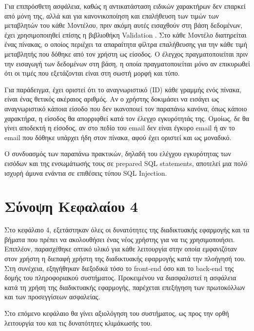 Για επιπρόσθετη ασφάλεια, καθώς η αντικατάσταση ειδικών χαρακτήρων δεν επαρκεί από μόνη της, αλλά και για κανονικοποίηση και επαλήθευση των τιμών των μεταβλητών του κάθε Μοντέλου, πριν ακόμη αυτές εισαχθούν στη βάση δεδομένων, έχει χρησιμοποιηθεί επίσης η βιβλιοθήκη Validation \cite{CodeIgniter_validation}. Στο κάθε Μοντέλο διατηρείται ένας πίνακας, ο οποίος περιέχει τα απαραίτητα φίλτρα επαλήθευσης για την κάθε τιμή μεταβλητής που δόθηκε από τον χρήστη ως είσοδος. Ο έλεγχος πραγματοποιείται πριν την εισαγωγή των δεδομένων στη βάση, η οποία πραγματοποιείται μόνο αν επικυρωθεί ότι οι τιμές που εξετάζονται είναι στη σωστή μορφή και τύπο.

Για παράδειγμα, έχει οριστεί ότι το αναγνωριστικό (ID) κάθε γραμμής ενός πίνακα, είναι ένας θετικός ακέραιος αριθμός. Αν ο χρήστης δοκιμάσει να εισάγει ως αναγνωριστικό κάποια είσοδο που δεν ικανοποιεί τον παραπάνω κανόνα, όπως κάποιο χαρακτήρα, η είσοδος θα απορριφθεί κατά τον έλεγχο εγκυρότητάς της. Ομοίως, δε θα γίνει αποδεκτή η είσοδος, αν στο πεδίο του email δεν είναι έγκυρο email ή αν το email που δόθηκε υπάρχει ήδη στον πίνακα, αφού έχει οριστεί και ως μοναδικό.

Ο συνδυασμός των παραπάνω πρακτικών, δηλαδή του ελέγχου εγκυρότητας των εισόδων και της ενσωμάτωσής τους σε prepared SQL statements, αποτελεί μια πολύ ισχυρή άμυνα ενάντια σε επιθέσεις τύπου SQL Injection.

\section{Σύνοψη Κεφαλαίου 4}
Στο κεφάλαιο 4, εξετάστηκαν όλες οι δυνατότητες της διαδικτυακής εφαρμογής και τα βήματα που πρέπει να ακολουθήσει ένας νέος χρήστης για να τις χρησιμοποιήσει. Επιπλέον, παρασχέθηκε οπτικό υλικό για κάθε λειτουργία στην οποία εμφανιζόταν στον χρήστη η διεπαφή χρήστη της διαδικτυακής εφαρμογής κατά την πλοήγησή του. Στη συνέχεια, εξηγήθηκαν διεξοδικά τόσο το front-end όσο και το back-end της δομής του πληροφοριακού συστήματος. Προκειμένου να διασφαλιστεί η ασφάλεια κατά τη χρήση της διαδικτυακής εφαρμογής, παρέχεται επεξήγηση των πρωτοκόλλων και των προσεγγίσεων ασφαλείας.

Στο επόμενο κεφάλαιο θα γίνει αξιολόγηση του συστήματος, ως προς την ορθή λειτουργία του και τις δυνατότητες κλιμάκωσής του.

